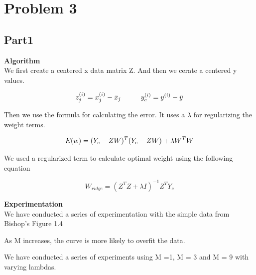 \section{Problem 3}

\subsection{Part1}

{\bfseries Algorithm} \\
We first create a centered x data matrix Z. And then we cerate a centered y values.

\begin{equation}
z^{(i)}_{j} = x^{(i)}_{j} - \bar{x}_{j} \hspace{10 mm} 
y^{(i)}_{c} = y^{(i)} - \bar{y} \\
\end{equation}

Then we use the formula for calculating the error. It uses a $\lambda$ for regularizing the
weight terms. 

\begin{equation}
  E(w)= (Y_{c} - ZW)^T(Y_{c}-ZW) + \lambda W^TW \\
\end{equation}

We used a regularized term to calculate optimal weight using the following equation

\begin{equation}
  W_{ridge} = (Z^{T}Z + \lambda I)^{-1}Z^{T}Y_{c}
\end{equation}

{\bfseries Experimentation} \\
We have conducted a series of experimentation with the simple data from Bishop's Figure 1.4

As M increases, the curve is more likely to overfit the data. 

We have conducted a series of experiments using M =1, M = 3 and M = 9 with varying lambdas. 


